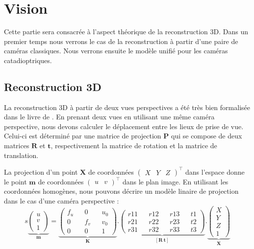 \section{Vision}
\label{sec:vision}

Cette partie sera consacrée à l'aspect théorique de la reconstruction 3D.
Dans un premier temps nous verrons le cas de la reconstruction à partir d'une paire de caméras classiques.
Nous verrons ensuite le modèle unifié pour les caméras catadioptriques.

\subsection{Reconstruction 3D}
\label{sub:reconstruction}

La reconstruction 3D à partir de deux vues perspectives a été très bien formalisée dans le livre de \citeauthor{Hartley03Book} \cite{Hartley03Book}.
En prenant deux vues en utilisant une même caméra perspective, nous devons calculer le déplacement entre les lieux de prise de vue.
Celui-ci est déterminé par une matrice de projection $\mathbf{P}$ qui se compose de deux matrices $\mathbf{R}$ et $\mathbf{t}$, respectivement la matrice de rotation et la matrice de translation.

La projection d'un point $\mathbf{X}$ de coordonnées $\begin{pmatrix}X&Y&Z\end{pmatrix}^\top$ dans l'espace donne le point $\mathbf{m}$ de coordonnées $\begin{pmatrix}u&v\end{pmatrix}^\top$ dans le plan image.
En utilisant les coordonnées homogènes, nous pouvons décrire un modèle linaire de projection dans le cas d'une caméra perspective :
\begin{equation}
s \underbrace{\begin{pmatrix}u \\ v \\ 1\end{pmatrix}}_{\mathbf{m}} = 
\underbrace{\begin{pmatrix}f_u && 0 && u_0 \\ 0 && f_v && v_0 \\ 0 && 0 && 1\end{pmatrix}}_{\mathbf{K}} . 
\underbrace{\begin{pmatrix}r11 && r12 && r13 && t1 \\ r21 && r22 && r23 && t2 \\ r31 && r32 && r33 && t3\end{pmatrix}}_{[\mathbf{R~t}]} . 
\underbrace{\begin{pmatrix}X \\ Y \\ Z \\ 1\end{pmatrix}}_{\mathbf{X}}
\label{eq:projection}
\end{equation}

